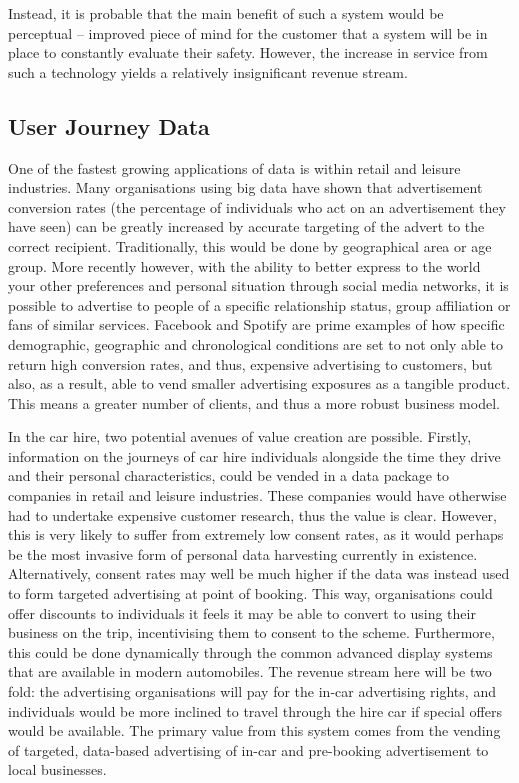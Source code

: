 \documentclass[conference]{IEEEtran}
\begin{document}
Instead, it is probable that the main benefit of such a system would
be perceptual – improved piece of mind for the customer that a system
will be in place to constantly evaluate their safety.  However, the
increase in service from such a technology yields a relatively
insignificant revenue stream.

\subsection{User Journey Data}

One of the fastest growing applications of data is within retail and
leisure industries.  Many organisations using big data have shown that
advertisement conversion rates (the percentage of individuals who act
on an advertisement they have seen) can be greatly increased by
accurate targeting of the advert to the correct
recipient. Traditionally, this would be done by geographical area or
age group. More recently however, with the ability to better express
to the world your other preferences and personal situation through
social media networks, it is possible to advertise to people of a
specific relationship status, group affiliation or fans of similar
services. Facebook and Spotify are prime examples of how specific
demographic, geographic and chronological conditions are set to not
only able to return high conversion rates, and thus, expensive
advertising to customers, but also, as a result, able to vend smaller
advertising exposures as a tangible product. This means a greater
number of clients, and thus a more robust business model.

In the car hire, two potential avenues of value creation are possible.
Firstly, information on the journeys of car hire individuals alongside
the time they drive and their personal characteristics, could be
vended in a data package to companies in retail and leisure
industries. These companies would have otherwise had to undertake
expensive customer research, thus the value is clear. However, this is
very likely to suffer from extremely low consent rates, as it would
perhaps be the most invasive form of personal data harvesting
currently in existence. Alternatively, consent rates may well be much
higher if the data was instead used to form targeted advertising at
point of booking. This way, organisations could offer discounts to
individuals it feels it may be able to convert to using their business
on the trip, incentivising them to consent to the scheme. Furthermore,
this could be done dynamically through the common advanced display
systems that are available in modern automobiles. The revenue stream
here will be two fold: the advertising organisations will pay for the
in-car advertising rights, and individuals would be more inclined to
travel through the hire car if special offers would be available.  The
primary value from this system comes from the vending of targeted,
data-based advertising of in-car and pre-booking advertisement to
local businesses.
\end{document}
